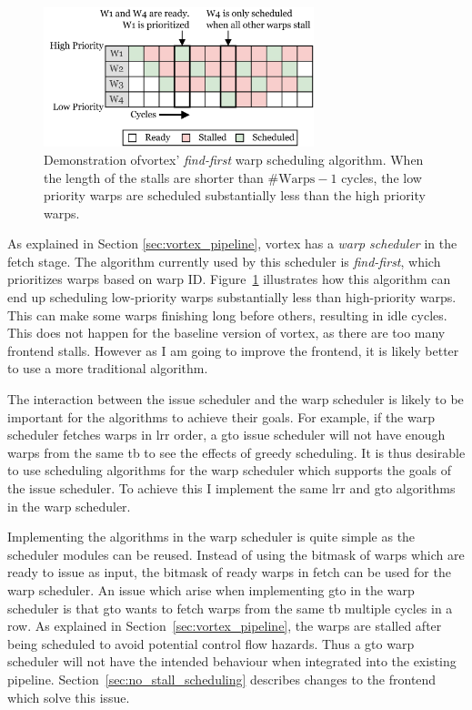 \begin{figure}
    \centering
    \includegraphics[width=0.7\textwidth]{figures/find-first-scheduling-2.png}
    \caption[Demonstration of \Gls{vortex}' find-first warp scheduler.]{Demonstration of\Gls{vortex}' \textit{find-first} warp scheduling algorithm. When the length of the stalls are shorter than $\text{\#Warps} - 1$ cycles, the low priority warps are scheduled substantially less than the high priority warps.}
    \label{fig:find_first_scheduling}
\end{figure}

As explained in Section \ref{sec:vortex_pipeline}, \Gls{vortex} has a \textit{warp scheduler} in the fetch stage. The algorithm currently used by this scheduler is \textit{find-first}, which prioritizes warps based on warp ID. Figure~\ref{fig:find_first_scheduling} illustrates how this algorithm can end up scheduling low-priority warps substantially less than high-priority warps. This can make some warps finishing long before others, resulting in idle cycles. This does not happen for the baseline version of \Gls{vortex}, as there are too many frontend stalls. However as I am going to improve the frontend, it is likely better to use a more traditional algorithm.

The interaction between the issue scheduler and the warp scheduler is likely to be important for the algorithms to achieve their goals. For example, if the warp scheduler fetches warps in \acrshort{lrr} order, a \acrshort{gto} issue scheduler will not have enough warps from the same \acrshort{tb} to see the effects of greedy scheduling. It is thus desirable to use scheduling algorithms for the warp scheduler which supports the goals of the issue scheduler. To achieve this I implement the same \acrshort{lrr} and \acrshort{gto} algorithms in the warp scheduler.

Implementing the algorithms in the warp scheduler is quite simple as the scheduler modules can be reused. Instead of using the bitmask of warps which are ready to issue as input, the bitmask of ready warps in fetch can be used for the warp scheduler. An issue which arise when implementing \acrshort{gto} in the warp scheduler is that \acrshort{gto} wants to fetch warps from the same \acrshort{tb} multiple cycles in a row. As explained in Section~\ref{sec:vortex_pipeline}, the warps are stalled after being scheduled to avoid potential control flow hazards. Thus a \acrshort{gto} warp scheduler will not have the intended behaviour when integrated into the existing pipeline. Section~\ref{sec:no_stall_scheduling} describes changes to the frontend which solve this issue.

